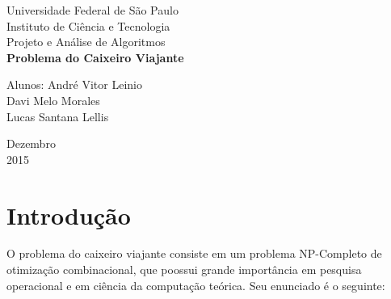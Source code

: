 \documentclass[a4paper, 12pt]{article}
\begin{document}

\begin{titlepage}
	\begin{center}
	

		\Huge{Universidade Federal de São Paulo}\\
		\large{Instituto de Ciência e Tecnologia}\\ 
		\large{Projeto e Análise de Algoritmos}\\ 
		\vspace{15pt}
        \vspace{95pt}
        \textbf{\LARGE{Problema do Caixeiro Viajante}}\\
		\vspace{3,5cm}
	\end{center}
	
	\begin{flushleft}
		\begin{tabbing}
			Alunos: André Vitor Leinio \\
					\hspace{3.5em}	Davi Melo Morales \\
                   	\hspace{3.5em}	Lucas Santana Lellis
	\end{tabbing}
 \end{flushleft}
	\vspace{1cm}
	
	\begin{center}
		\vspace{\fill}
			 Dezembro\\
		 2015
			\end{center}
\end{titlepage}

\section{Introdução}
O problema do caixeiro viajante consiste em um problema NP-Completo de otimização combinacional, que poossui grande importância em pesquisa operacional e em ciência da computação teórica. Seu enunciado é o seguinte:
\end{document}
